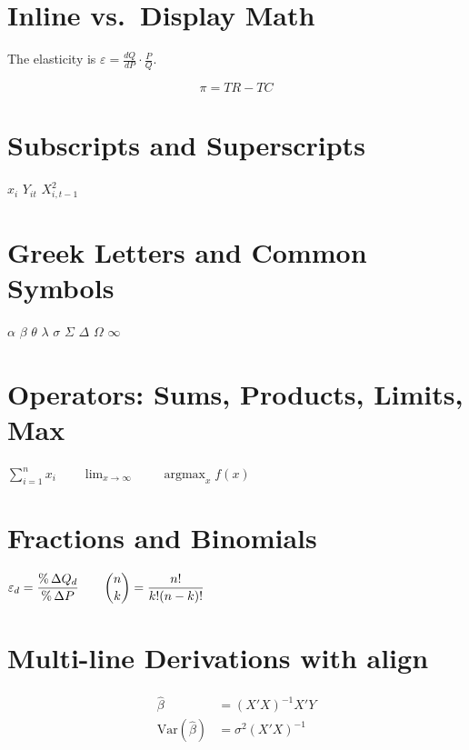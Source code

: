 \documentclass[11pt,a4paper]{article}
\begin{document}
\section*{Inline vs.\ Display Math}
The elasticity is $\varepsilon = \frac{dQ}{dP}\cdot\frac{P}{Q}$.

\begin{equation}
  \pi = TR - TC
\end{equation}

\section*{Subscripts and Superscripts}
$x_i$              %
\quad
$Y_{it}$           %
\quad
$X_{i,t-1}^{2}$    %

\section*{Greek Letters and Common Symbols}
$\alpha$  $\beta$  $\theta$  $\lambda$  $\sigma$
\quad
$\Sigma$  $\Delta$  $\Omega$  $\infty$

\section*{Operators: Sums, Products, Limits, Max}
$\displaystyle\sum_{i=1}^{n} x_i \qquad \lim_{x\to\infty} \qquad
\operatorname*{argmax}_{x} f(x)$

\section*{Fractions and Binomials}
$\varepsilon_d = \dfrac{\%\,\Delta Q_d}{\%\,\Delta P}
\qquad \dbinom{n}{k} = \dfrac{n!}{k!(n-k)!}$

\section*{Multi-line Derivations with align}
\begin{align}
  \hat{\beta} &= (X'X)^{-1}X'Y \\
  \text{Var}(\hat{\beta}) &= \sigma^2 (X'X)^{-1}
\end{align}
\end{document}
